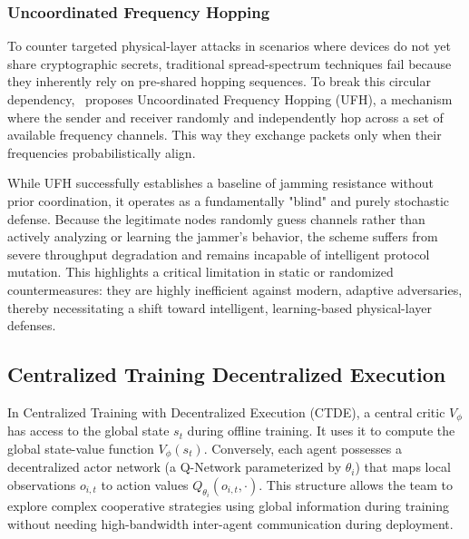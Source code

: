 \documentclass[conference]{IEEEtran}
\newcommand{\rar}[1]{{\color{blue}{[#1]}}}
\begin{document}
\subsubsection{Uncoordinated Frequency Hopping}
To counter targeted physical-layer attacks in scenarios where devices do not yet share cryptographic secrets, traditional spread-spectrum techniques fail because they inherently rely on pre-shared hopping sequences.
To break this circular dependency,~ proposes Uncoordinated Frequency Hopping (UFH), a mechanism where the sender and receiver randomly and independently hop across a set of available frequency channels.
This way they exchange packets only when their frequencies probabilistically align.

While UFH successfully establishes a baseline of jamming resistance without prior coordination, it operates as a fundamentally "blind" and purely stochastic defense.
Because the legitimate nodes randomly guess channels rather than actively analyzing or learning the jammer’s behavior, the scheme suffers from severe throughput degradation and remains incapable of intelligent protocol mutation.
This highlights a critical limitation in static or randomized countermeasures: they are highly inefficient against modern, adaptive adversaries, thereby necessitating a shift toward intelligent, learning-based physical-layer defenses.
\rar{More of anti-jamming, maybe interesting as baseline but not relevant to proposed method}

\subsection{Centralized Training Decentralized Execution } \rar{probably get rid of}
In Centralized Training with Decentralized Execution (CTDE), a central critic $V_{\phi}$ has access to the global state $s_t$ during offline training. 
It uses it to compute the global state-value function $V_{\phi}(s_t)$. 
Conversely, each agent possesses a decentralized actor network (a Q-Network parameterized by $\theta_i$) that maps local observations $o_{i,t}$ to action values $Q_{\theta_i}(o_{i,t},\cdot)$. 
This structure allows the team to explore complex cooperative strategies using global information during training without needing high-bandwidth inter-agent communication during deployment. 
\end{document}
